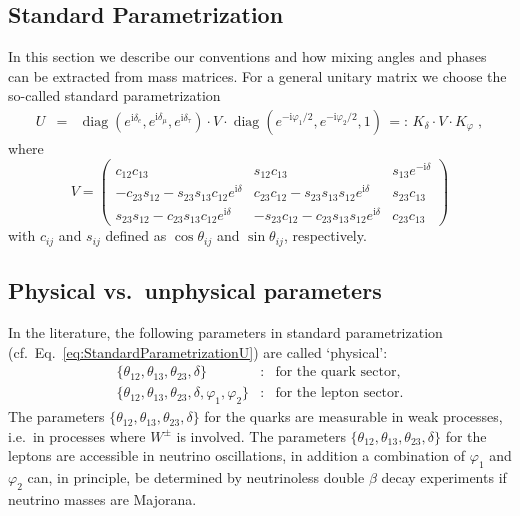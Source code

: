 \documentclass[12pt,a4paper,twoside]{scrartcl}
\DeclareMathOperator{\diag}{diag}
\def\I{\mathrm{i}}
\numberwithin{equation}{section}
\numberwithin{table}{section}
\begin{document}
\subsection{Standard Parametrization}
In this section we describe our conventions and how mixing angles and 
phases can be extracted from mass matrices.
For a general unitary matrix we choose the so-called 
standard parametrization
\begin{eqnarray}\label{eq:StandardParametrizationU}
 U & = &\diag(e^{\I\delta_{e}},e^{\I\delta_{\mu}},e^{\I\delta_{\tau}}) \cdot V \cdot 
 \diag(e^{-\I\varphi_1/2},e^{-\I\varphi_2/2},1)
 \,=:\,
 K_\delta\cdot V\cdot K_\varphi\;,
\end{eqnarray}
where 
\begin{equation}
 V=\left(
 \begin{array}{ccc}
 c_{12}c_{13} & s_{12}c_{13} & s_{13}e^{-\I\delta}\\
 -c_{23}s_{12}-s_{23}s_{13}c_{12}e^{\I\delta} &
 c_{23}c_{12}-s_{23}s_{13}s_{12}e^{\I\delta} & s_{23}c_{13}\\
 s_{23}s_{12}-c_{23}s_{13}c_{12}e^{\I\delta} &
 -s_{23}c_{12}-c_{23}s_{13}s_{12}e^{\I\delta} & c_{23}c_{13}
 \end{array}
 \right)
\end{equation}
with $c_{ij}$ and $s_{ij}$ defined as $\cos\theta_{ij}$ and
$\sin\theta_{ij}$, respectively. 

\subsection{Physical vs.~unphysical parameters}

In the literature, the following parameters in standard parametrization
(cf.\ Eq.~\eqref{eq:StandardParametrizationU}) are called `physical':
\begin{subequations}
\begin{eqnarray}
 \{\theta_{12},\theta_{13},\theta_{23},\delta\}
 & : & \text{for the quark sector,}\\
 \{\theta_{12},\theta_{13},\theta_{23},\delta,\varphi_1,\varphi_2\}
 & : & \text{for the lepton sector.}
\end{eqnarray}
\end{subequations}
The parameters $\{\theta_{12},\theta_{13},\theta_{23},\delta\}$ for the quarks
are measurable in weak processes, i.e.\ in processes where $W^\pm$ is involved.
The parameters $\{\theta_{12},\theta_{13},\theta_{23},\delta\}$ for the leptons
are accessible in neutrino oscillations, in addition a combination of
$\varphi_1$ and $\varphi_2$ can, in principle,  be determined by neutrinoless
double $\beta$ decay experiments if neutrino masses are Majorana.
\end{document}

